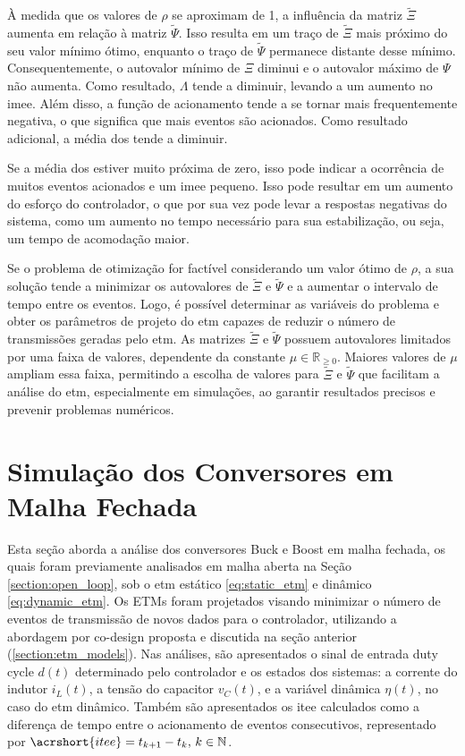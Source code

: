 À medida que os valores de $\rho$ se aproximam de 1, a influência da matriz $\tilde{\Xi}$ aumenta em relação à matriz $\tilde{\Psi}$. Isso resulta em um traço de $\tilde{\Xi}$ mais próximo do seu valor mínimo ótimo, enquanto o traço de $\tilde{\Psi}$ permanece distante desse mínimo. Consequentemente, o autovalor mínimo de $\Xi$ diminui e o autovalor máximo de $\Psi$ não aumenta. Como resultado, $\Lambda$ tende a diminuir, levando a um aumento no \acrshort{imee}. Além disso, a função de acionamento tende a se tornar mais frequentemente negativa, o que significa que mais eventos são acionados. Como resultado adicional, a média dos  tende a diminuir.

Se a média dos  estiver muito próxima de zero, isso pode indicar a ocorrência de muitos eventos acionados e um \acrshort{imee} pequeno. Isso pode resultar em um aumento do esforço do controlador, o que por sua vez pode levar a respostas negativas do sistema, como um aumento no tempo necessário para sua estabilização, ou seja, um tempo de acomodação maior.

Se o problema de otimização for factível considerando um valor ótimo de $\rho$, a sua solução tende a minimizar os autovalores de $\tilde{\Xi}$ e $\tilde{\Psi}$ e a aumentar o intervalo de tempo entre os eventos. Logo, é possível determinar as variáveis do problema e obter os parâmetros de projeto do \acrshort{etm} capazes de reduzir o número de transmissões geradas pelo \acrshort{etm}.
As matrizes $\tilde{\Xi}$ e $\tilde{\Psi}$ possuem autovalores limitados por uma faixa de valores, dependente da constante $\mu \in \mathbb{R}_{\geq 0}$. Maiores valores de $\mu$ ampliam essa faixa, permitindo a escolha de valores para $\tilde{\Xi}$ e $\tilde{\Psi}$ que facilitam a análise do \acrshort{etm}, especialmente em simulações, ao garantir resultados precisos e prevenir problemas numéricos. 

\section{Simulação dos Conversores em Malha Fechada}

Esta seção aborda a análise dos conversores Buck e Boost em malha fechada, os quais foram previamente analisados em malha aberta na Seção \ref{section:open_loop}, sob o \acrshort{etm} estático \eqref{eq:static_etm} e dinâmico \eqref{eq:dynamic_etm}. Os ETMs foram projetados visando minimizar o número de eventos de transmissão de novos dados para o controlador, utilizando a abordagem por co-design proposta e discutida na seção anterior (\autoref{section:etm_models}). Nas análises, são apresentados o sinal de entrada duty cycle $d(t)$ determinado pelo controlador e os estados dos sistemas: a corrente do indutor $i_L(t)$, a tensão do capacitor $v_C(t)$, e a variável dinâmica $\eta(t)$, no caso do \acrshort{etm} dinâmico. Também são apresentados os \acrfull{itee} calculados como a diferença de tempo entre o acionamento de eventos consecutivos, representado por $\acrshort{itee} = t_{k + 1} - t_k, \, k \in \mathbb{N}$.

